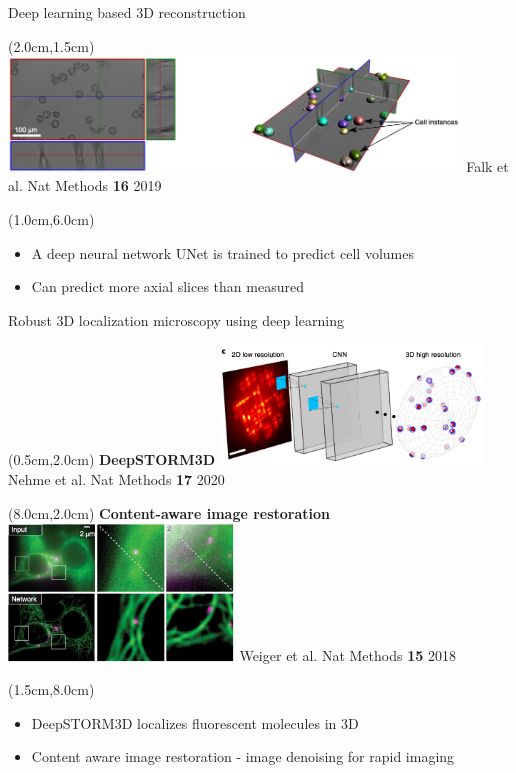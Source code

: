 \documentclass{beamer}					%
\begin{document}
\begin{frame}{Deep learning based 3D reconstruction}
\begin{textblock*}{12cm}(2.0cm,1.5cm)
\includegraphics[width=12cm]{../../postdoc/sartorius/media/UNET-1.png}
Falk et al. Nat Methods \textbf{16} 2019
\end{textblock*}
\begin{textblock*}{12cm}(1.0cm,6.0cm)
\begin{itemize}
\item A deep neural network UNet is trained to predict cell volumes
\item Can predict more axial slices than measured
\end{itemize}
\end{textblock*}
\end{frame}


\begin{frame}{Robust 3D localization microscopy using deep learning}
\begin{textblock*}{7cm}(0.5cm,2.0cm)
\textbf{DeepSTORM3D}
\includegraphics[width=7cm]{../../postdoc/sartorius/media/DS3D.png}
Nehme et al. Nat Methods \textbf{17} 2020
\end{textblock*}
\begin{textblock*}{6cm}(8.0cm,2.0cm)
\textbf{Content-aware image restoration}
\includegraphics[width=6cm]{../../postdoc/sartorius/media/CARE.png}
Weiger et al. Nat Methods \textbf{15} 2018
\end{textblock*}
\begin{textblock*}{12cm}(1.5cm,8.0cm)
\begin{itemize}
\item DeepSTORM3D localizes fluorescent molecules in 3D
\item Content aware image restoration - image denoising for rapid imaging
\end{itemize}
\end{textblock*}
\end{frame}
\end{document}
